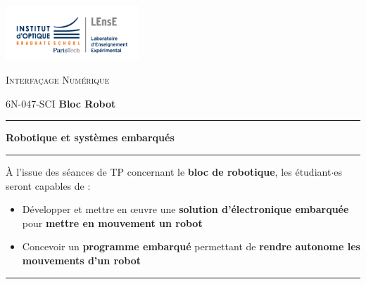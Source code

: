 \documentclass[a4paper,11pt,titlepage]{article} %
\begin{document}
\newpage
\strut %


\newpage
\pagestyle{empty}

\begin{minipage}[c]{.25\linewidth}
	\includegraphics[width=5cm]{images/Logo-LEnsE.png}
\end{minipage} \hfill
\begin{minipage}[c]{.4\linewidth}

\begin{center}
\vspace{0.3cm}
{\Large \textsc{Interfaçage Numérique}}

\medskip

6N-047-SCI \qquad \textbf{\Large Bloc Robot}

\end{center}
\end{minipage}\hfill

\vspace{0.5cm}

\noindent \rule{\linewidth}{1pt}

{\noindent\Large  \rule[-7pt]{0pt}{30pt} \textbf{Robotique et systèmes embarqués}}

\noindent \rule{\linewidth}{1pt}

\bigskip 


{\large À l'issue des séances de TP concernant le \textbf{bloc de robotique}, les étudiant$\cdot$es seront capables de :}

\medskip

\begin{itemize}
	\item Développer et mettre en \oe{}uvre une \textbf{solution d'électronique embarquée} pour \textbf{mettre en mouvement un robot}
	\item Concevoir un \textbf{programme embarqué} permettant de \textbf{rendre autonome les mouvements d'un robot}
\end{itemize}

\noindent \rule{\linewidth}{1pt}


\end{document}
